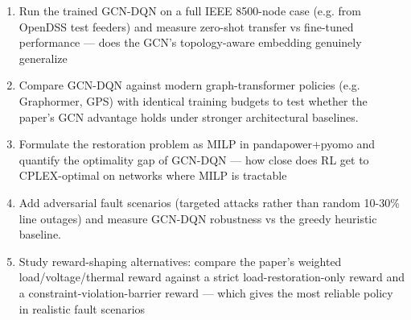 \begin{enumerate}[leftmargin=1.6em,itemsep=0.2em,topsep=0.2em,label=Q\arabic*.]
\item Run the trained GCN-DQN on a full IEEE 8500-node case (e.g. from OpenDSS test feeders) and measure zero-shot transfer vs fine-tuned performance --- does the GCN's topology-aware embedding genuinely generalize
\item Compare GCN-DQN against modern graph-transformer policies (e.g. Graphormer, GPS) with identical training budgets to test whether the paper's GCN advantage holds under stronger architectural baselines.
\item Formulate the restoration problem as MILP in pandapower+pyomo and quantify the optimality gap of GCN-DQN --- how close does RL get to CPLEX-optimal on networks where MILP is tractable
\item Add adversarial fault scenarios (targeted attacks rather than random 10-30\% line outages) and measure GCN-DQN robustness vs the greedy heuristic baseline.
\item Study reward-shaping alternatives: compare the paper's weighted load/voltage/thermal reward against a strict load-restoration-only reward and a constraint-violation-barrier reward --- which gives the most reliable policy in realistic fault scenarios
\end{enumerate}

